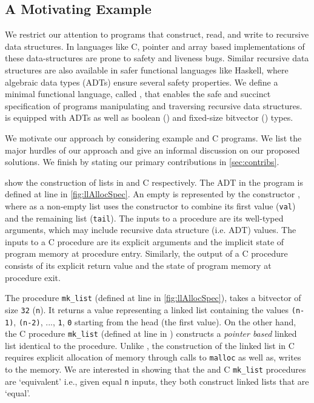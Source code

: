 \subsection{A Motivating Example}
\label{sec:motivatingexample}
We restrict our attention to programs that construct, read, and write
to recursive data structures. In languages like C, pointer and array based
implementations of these data-structures are prone to safety and liveness bugs.
Similar recursive data structures are also available in safer functional languages like Haskell,
where algebraic data types (ADTs) \cite{hope} ensure several safety properties.
We define a minimal functional language, called \SpecL{}, that enables the safe
and succinct specification of programs manipulating and traversing recursive data structures.
\SpecL{} is equipped with ADTs as well as boolean () and fixed-size bitvector () types.

We motivate our approach by considering example \SpecL{} and C programs.
We list the major hurdles of our approach and give an informal discussion on our proposed solutions.
We finish by stating our primary contributions in \cref{sec:contribs}.



 show the construction of lists in \SpecL{} and C respectively.
The  ADT in the \SpecL{} program is defined at line  in \cref{fig:llAllocSpec}.
An empty  is represented by the constructor , where as a non-empty list uses
the  constructor to combine its first value ({\tt val}) and
the remaining list ({\tt tail}).
The inputs to a \SpecL{} procedure are its well-typed arguments, which may include recursive data structure (i.e. ADT) values.
The inputs to a C procedure are its explicit arguments and the implicit state of program memory at procedure entry.
Similarly, the output of a C procedure consists of its explicit return value and the state of program memory at procedure exit.

The \SpecL{} procedure {\tt mk\_list} (defined at line  in \cref{fig:llAllocSpec}), takes
a bitvector of size {\tt 32} ({\tt n}).
It returns a  value representing a linked list containing
the values {\tt (n-1)}, {\tt (n-2)}, ..., {\tt 1}, {\tt 0} starting from the head (the first value).
On the other hand, the C procedure {\tt mk\_list} (defined at line  in )
constructs a {\em pointer based} linked list identical to the \SpecL{} procedure.
Unlike \SpecL{}, the construction of the linked list in C requires explicit allocation of memory through calls to {\tt malloc}
as well as, writes to the memory.
We are interested in showing that the \SpecL{} and C {\tt mk\_list} procedures are `equivalent'
i.e., given equal {\tt n} inputs, they both construct linked lists that are `equal'.

